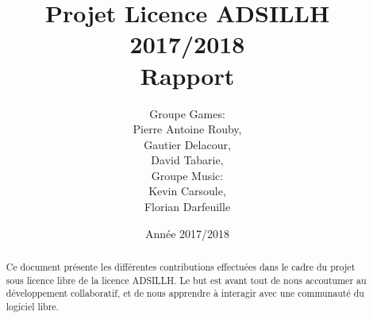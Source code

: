 \documentclass[12pt]{report}
\title{Projet Licence ADSILLH 2017/2018\\Rapport}
\author{Groupe Games:\\ Pierre Antoine Rouby,\\ Gautier Delacour,\\
  \vspace{0.8cm}
  David Tabarie,\\ Groupe Music:\\ Kevin Carsoule,\\ Florian Darfeuille}
\date{Année 2017/2018}
\begin{document}
\maketitle


\begin{abstract}
Ce document présente les différentes contributions effectuées dans le
cadre du projet sous licence libre de la licence ADSILLH. Le but est
avant tout de nous accoutumer au développement collaboratif, et de
nous apprendre à interagir avec une communauté du logiciel libre.
\end{abstract}

\tableofcontents




\end{document}
